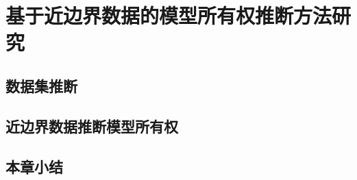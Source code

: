 
\chapter{基于近边界数据的模型所有权推断方法研究}
\label{chpt:method2}
\section{数据集推断}
\section{近边界数据推断模型所有权}
\section{本章小结}